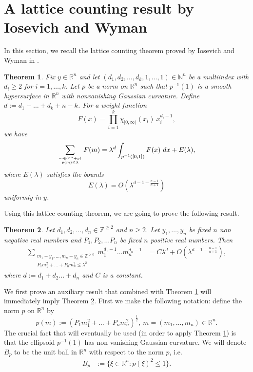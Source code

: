 \documentclass[11pt,lettersize,reqno,fullpage]{amsart}
\newtheorem{thm}{Theorem}[section]
\begin{document}
\section{A lattice counting result by Iosevich and Wyman} 
In this section, we recall the lattice counting theorem proved by Iosevich and Wyman in \cite{Weyl_Wyman_Iosevich}.  
\begin{thm}
\label{IW_Main_Result}
\cite[page 597, theorem 1.8]{Weyl_Wyman_Iosevich}
Fix $y \in \mathbb{R}^{n} $ and let 
$(d_{1},d_{2},\dots,d_{k},1,\dots,1) \in \mathbb{N}^{n} $ be a multiindex with $d_{i}\geq 2 $ 
for $i=1,\dots,k $. Let $p$ be a norm on $\mathbb{R}^{n} $ such that $p^{-1}(1) $ is a smooth hypersurface in $\mathbb{R}^{n} $ with nonvanishing Gaussian curvature. Define $d:= d_1 + \ldots + d_{k}+ n-k$.
For a weight function \[F(x)=\prod_{i=1}^{k} \chi_{[0,\infty)}(x_{i})\ x_{i}^{d_{i}-1}, \]
we have \[\sum_{{m \in (\mathbb{Z}^{n}+y)}\atop {p(m)\leq \lambda}} F(m)=\lambda^{ d} \int_{p^{-1}([0,1])} F(x) \ dx+E(\lambda),\] 
where 
$E(\lambda) $ satisfies the bounds \[E(\lambda)=O\left(\lambda^{ d-1-\frac{n-1}{n+1}} \right) \]
uniformly in $y$.
\end{thm}
Using this lattice counting theorem, we are going to prove the following result. 
\begin{thm}
\label{IW_Lattice}
Let $d_1, d_2, \ldots, d_n \in \mathbb{Z}^{\geq 2}$ and $n\geq 2$. 
Let $y_1, \ldots, y_n$ be fixed $n$ non negative real numbers and 
$P_1, P_2, \ldots P_n$ be fixed $n$ positive real numbers. 
Then
\begin{align}
\sum_{\substack{m_1-y_1, \ldots, m_n-y_n \in \mathbb{Z}^{\geq 0}\\ P_1 m_1^2 + \ldots + P_n m_n^2 \leq \lambda^2}} 
m_1^{d_1-1}\ldots m_n^{d_n-1}&= C \lambda^{d} 
+ O\left(\lambda^{d-1-\frac{n-1}{n+1}}\right),
\end{align}
where $d:= d_1 + d_2 \ldots + d_n$ and $C$ is a constant. 
\end{thm}
We first prove an auxiliary result 
that combined with Theorem \ref{IW_Main_Result} will immediately imply 
Theorem \ref{IW_Lattice}. First we make the following notation: define 
the norm $p$ on $\mathbb{R}^{n} $ by 
\[p(m):= \left( P_{1}m_{1}^{2}+\dots+P_{n}m_{n}^{2}\right)^{\frac{1}{2}},\ m=(m_{1},\dots,m_{n})\in \mathbb{R}^{n}. \] 
The crucial fact that will eventually be used (in order to apply Theorem \ref{IW_Main_Result}) 
is that 
the ellipsoid $p^{-1}(1) $
has non vanishing Gaussian curvature.
We will denote $B_p$ to be the unit ball in $\mathbb{R}^n$ with respect to the norm $p$, i.e.   
\begin{align*}
B_p &:= \{\xi \in \mathbb{R}^n : p(\xi)^2 \leq 1\}. 
\end{align*} 
\end{document}
